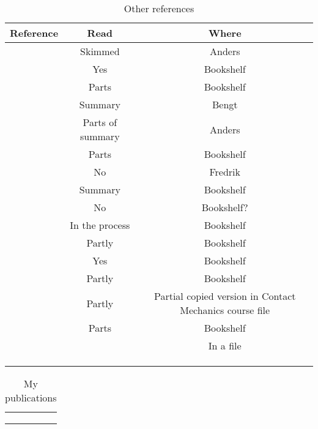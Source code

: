 \documentclass{article}
\begin{document}


\begin{table}
\caption{Other references}
\label{tab:other}
\centering
\begin{tabular}{c|c|c}
Reference & Read & Where\\ \hline
\citet{Lunden1991} & Skimmed & Anders \\
\citet{Wriggers2006book} & Yes & Bookshelf \\
\citet{DoneaHuerta2003book} & Parts & Bookshelf \\
\citet{Jergeus1998phd} & Summary & Bengt \\
\citet{Ahlstrom2001phd} & Parts of summary & Anders \\
\citet{Vernersson2006phd} & Parts & Bookshelf \\
\citet{Hakansson2007phd} & No & Fredrik \\
\citet{Caprioli2011lic} & Summary & Bookshelf \\
\citet{Petersson1999lic} & No & Bookshelf? \\
\citet{Brenner2008book} & In the process & Bookshelf \\
\citet{Johnson1987book} & Partly & Bookshelf \\
\citet{OttosenPetersson1992book} & Yes & Bookshelf \\
\citet{Nielsen2003} & Partly & Bookshelf \\
\citet{Timoshenko1951book} & Partly & Partial copied version in Contact Mechanics course file \\
\citet{Ziegler1983book} & Parts & Bookshelf \\
\citet{Hetnarski2008book} &  & In a file \\
\citet{CraigKurdila2006book} &  &  \\
\citet{Marsden1994book} &  &  \\
\citet{BonetWood2008book} &  &  \\
\end{tabular}
\end{table}



\begin{table}
\caption{My publications}
\label{tab:mypublications}
\centering
\begin{tabular}{c}
\hline
\citet{Draganis2011} \\
\citet{Draganis2011lic} \\
\citet{Draganis2014} \\
\hline
\end{tabular}
\end{table}
\end{document}
